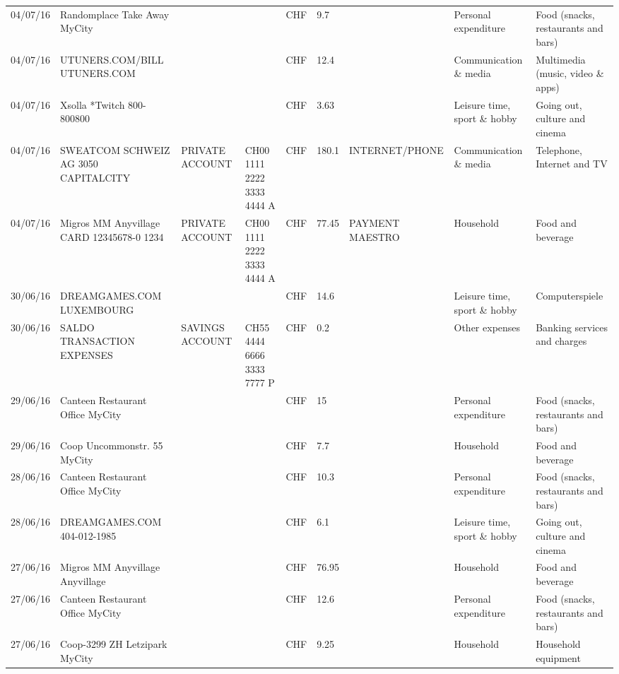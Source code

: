 \begin{landscape}
\begin{center}
\begin{longtable}{lllllllll}
		04/07/16 & Randomplace Take Away     MyCity &       &       & CHF   & 9.7   &       & Personal expenditure & Food (snacks, restaurants and bars) \\
		04/07/16 & UTUNERS.COM/BILL          UTUNERS.COM &       &       & CHF   & 12.4  &       & Communication \& media & Multimedia (music, video \& apps) \\
		04/07/16 & Xsolla *Twitch           800-800800 &       &       & CHF   & 3.63  &       & Leisure time, sport \& hobby & Going out, culture and cinema \\
		04/07/16 & SWEATCOM SCHWEIZ AG 3050 CAPITALCITY & PRIVATE ACCOUNT & CH00 1111 2222 3333 4444 A & CHF   & 180.1 & INTERNET/PHONE & Communication \& media & Telephone,  Internet and TV \\
		04/07/16 & Migros MM Anyvillage CARD 12345678-0 1234 & PRIVATE ACCOUNT & CH00 1111 2222 3333 4444 A & CHF   & 77.45 & PAYMENT MAESTRO & Household & Food and beverage \\
		30/06/16 & DREAMGAMES.COM           LUXEMBOURG &       &       & CHF   & 14.6  &       & Leisure time, sport \& hobby & Computerspiele \\
		30/06/16 & SALDO TRANSACTION EXPENSES & SAVINGS ACCOUNT & CH55 4444 6666 3333 7777 P & CHF   & 0.2   &       & Other expenses & Banking services and charges \\
		29/06/16 & Canteen Restaurant Office      MyCity &       &       & CHF   & 15    &       & Personal expenditure & Food (snacks, restaurants and bars) \\
		29/06/16 & Coop Uncommonstr. 55   MyCity &       &       & CHF   & 7.7   &       & Household & Food and beverage \\
		28/06/16 & Canteen Restaurant Office      MyCity &       &       & CHF   & 10.3  &       & Personal expenditure & Food (snacks, restaurants and bars) \\
		28/06/16 & DREAMGAMES.COM           404-012-1985 &       &       & CHF   & 6.1   &       & Leisure time, sport \& hobby & Going out, culture and cinema \\
		27/06/16 & Migros MM Anyvillage    Anyvillage &       &       & CHF   & 76.95 &       & Household & Food and beverage \\
		27/06/16 & Canteen Restaurant Office      MyCity &       &       & CHF   & 12.6  &       & Personal expenditure & Food (snacks, restaurants and bars) \\
		27/06/16 & Coop-3299 ZH Letzipark   MyCity &       &       & CHF   & 9.25  &       & Household & Household equipment \\

\end{longtable}
\end{center}
\end{landscape}
